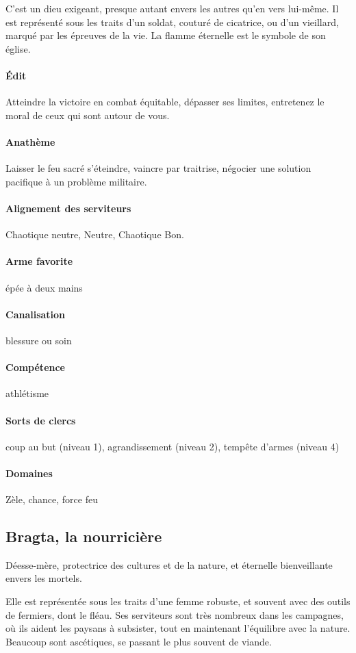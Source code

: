 \documentclass[10pt,a4paper]{book}
\begin{document}
C'est un dieu exigeant, presque autant envers les autres qu'en vers lui-même. Il est représenté sous les traits d'un soldat, couturé de cicatrice, ou d'un vieillard, marqué par les épreuves de la vie. La flamme éternelle est le symbole de son église.
\paragraph{Édit} Atteindre la victoire en combat équitable, dépasser ses limites, entretenez le moral de ceux qui sont autour de vous.
\paragraph{Anathème} Laisser le feu sacré s'éteindre, vaincre par traitrise, négocier une solution pacifique à un problème militaire.
\paragraph{Alignement des serviteurs} Chaotique neutre, Neutre, Chaotique Bon.
\paragraph{Arme favorite } épée à deux mains
\paragraph{Canalisation} blessure ou soin
\paragraph{Compétence}athlétisme
\paragraph{Sorts de clercs} coup au but (niveau 1), agrandissement (niveau 2), tempête d'armes (niveau 4)
\paragraph{Domaines }Zèle, chance, force feu
\subsection{Bragta, la nourricière}
Déesse-mère, protectrice des cultures et de la nature, et éternelle bienveillante envers les mortels.

Elle est représentée sous les traits d'une femme robuste, et souvent avec des outils de fermiers, dont le fléau. Ses serviteurs sont très nombreux dans les campagnes, où ils aident les paysans à subsister, tout en maintenant l'équilibre avec la nature. Beaucoup sont ascétiques, se passant le plus souvent de viande.
\end{document}
